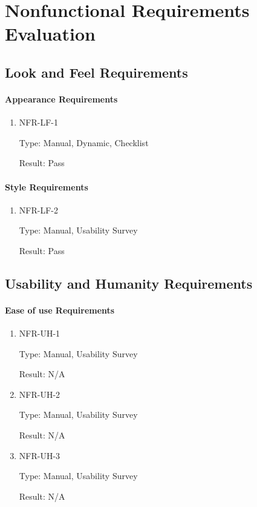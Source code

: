 \documentclass[12pt, titlepage]{article}
\begin{document}
\section{Nonfunctional Requirements Evaluation}

\subsection{Look and Feel Requirements}
		
\paragraph{Appearance Requirements}

\begin{enumerate}

\item{NFR-LF-1\\}

Type: Manual, Dynamic, Checklist 

Result: Pass

\end{enumerate}

\paragraph{Style Requirements}

\begin{enumerate}

\item{NFR-LF-2\\}

Type: Manual, Usability Survey 

Result: Pass

\end{enumerate}

\subsection{Usability and Humanity Requirements}

\paragraph{Ease of use Requirements}

\begin{enumerate}

\item{NFR-UH-1\\}

Type: Manual, Usability Survey 

Result: N/A

\item{NFR-UH-2\\}

Type: Manual, Usability Survey 

Result: N/A

\item{NFR-UH-3\\}

Type: Manual, Usability Survey 

Result: N/A

\end{enumerate}
\end{document}
